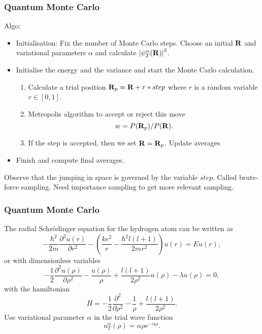 \documentclass[compress]{beamer}
\begin{document}
\frame
{
  \frametitle{Quantum Monte Carlo}
\begin{small}
{\scriptsize
Algo:
       \begin{itemize}
          \item Initialisation: Fix the number of Monte Carlo steps. Choose an initial ${\bf R}$ and
                variational parameters $\alpha$ and 
                calculate
                $\left|\psi_T^{\alpha}({\bf R})\right|^2$. 
          \item Initialise the energy and the variance and start the Monte Carlo calculation.
                \begin{enumerate}
                  \item Calculate  a trial position  ${\bf R}_p={\bf R}+r*step$
                        where $r$ is a random variable $r \in [0,1]$.
                  \item Metropolis algorithm to accept
                        or reject this move                         \[
                           w = P({\bf R}_p)/P({\bf R}).
                        \]
                  \item If the step is accepted, then we set 
                        ${\bf R}={\bf R}_p$. Update averages
                 \end{enumerate}
          \item Finish and
compute final averages.
      \end{itemize}
Observe that the jumping in space is governed by the variable $step$. Called brute-force sampling.
Need importance sampling to get more relevant sampling.
}
\end{small}
}

\frame
{
  \frametitle{Quantum Monte Carlo}
\begin{small}
{\scriptsize
The radial Schr\"odinger equation for the hydrogen atom can be
written as
\[
-\frac{\hbar^2}{2m}\frac{\partial^2 u(r)}{\partial r^2}-
\left(\frac{ke^2}{r}-\frac{\hbar^2l(l+1)}{2mr^2}\right)u(r)=Eu(r),
\]
or with dimensionless variables
\[
-\frac{1}{2}\frac{\partial^2 u(\rho)}{\partial \rho^2}-
\frac{u(\rho)}{\rho}+\frac{l(l+1)}{2\rho^2}u(\rho)-\lambda u(\rho)=0,
\label{eq:hydrodimless1}
\]
with the hamiltonian
\[
H=-\frac{1}{2}\frac{\partial^2 }{\partial \rho^2}-
\frac{1}{\rho}+\frac{l(l+1)}{2\rho^2}.
\]
Use variational parameter $\alpha$ in the trial
wave function 
\[
   u_T^{\alpha}(\rho)=\alpha\rho e^{-\alpha\rho}. 
   \label{eq:trialhydrogen}
\]

}
\end{small}
}
\end{document}
